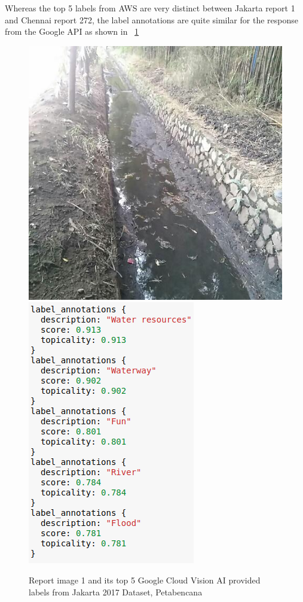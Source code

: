 Whereas the top 5 labels from AWS are very distinct between Jakarta report 1 and 
Chennai report 272, the label annotations are quite similar for the response
from the Google API as shown in \figureautorefname{}~\ref{fig:goog_1}
\begin{figure}[ht]
    \centering
    \captionsetup{justification=centering}
    \includegraphics[scale=0.3]{images/id/1.jpeg}
    \includegraphics[scale=0.6]{images/id/goog_1.png}
    \caption{Report image 1 and its top 5 Google Cloud Vision AI provided
    labels from Jakarta 2017 Dataset, Petabencana}\label{fig:goog_1}
\end{figure}





